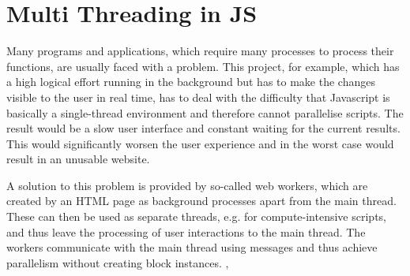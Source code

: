 \section{Multi Threading in JS}
\label{sec:tecWorker}
Many programs and applications, which require many processes to process their functions, are usually faced with a problem. This project, for example, which has a high logical effort running in the background but has to make the changes visible to the user in real time, has to deal with the difficulty that Javascript is basically a single-thread environment and therefore cannot parallelise scripts. The result would be a slow user interface and constant waiting for the current results. This would significantly worsen the user experience and in the worst case would result in an unusable website.

A solution to this problem is provided by so-called web workers, which are created by an HTML page as background processes apart from the main thread. These can then be used as separate threads, e.g. for compute-intensive scripts, and thus leave the processing of user interactions to the main thread. The workers communicate with the main thread using messages and thus achieve parallelism without creating block instances. \cite{Peng2017}, \cite{Bidelman2010}